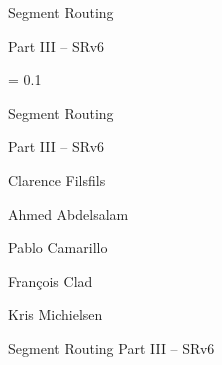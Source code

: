 
\frontmatter
\pagestyle{empty}

\vspace*{\fill}
\begin{center}
\HUGE\sffamily Segment Routing\par
Part III -- SRv6
\end{center}
\vspace*{\fill}
\cleardoublepage

\newlength\drop
\begingroup%
\drop = 0.1\textheight

\vspace*{\drop}
\begin{center}
\HUGE\textsf{Segment Routing}\par
\end{center}
\begin{center}
\HUGE\textsf{Part III -- SRv6}\par
\end{center}
\bigskip
\begin{center}
\LARGE\textsf{Clarence Filsfils}\par
\LARGE\textsf{Ahmed Abdelsalam}\par
\LARGE\textsf{Pablo Camarillo}\par
\LARGE\textsf{François Clad}\par
\LARGE\textsf{Kris Michielsen}\par
\end{center}
\endgroup


\clearpage
\thispagestyle{empty}
\begingroup\footnotesize
Segment Routing Part III -- SRv6

